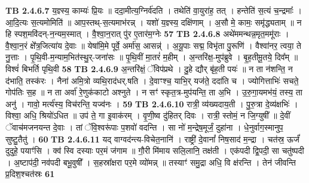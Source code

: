 \documentclass[17pt]{extarticle}
\begin{document}
                  \newline
                                \textbf{ TB 2.4.6.7} \newline
                  य॒ज्ञ्स्य॒ काम्यः॑ प्रि॒यः ॥ ददा॒मीत्य॒ग्निर्व॑दति । तथेति॑ वा॒युरा॑ह॒ तत् । हन्तेति॑ स॒त्यं च॒न्द्रमाः᳚ । आ॒दि॒त्यः स॒त्यमोमिति॑ ॥ आप॒स्तथ्-स॒त्यमाभ॑रन्न् । यशो॑ य॒ज्ञ्स्य॒ दक्षि॑णाम् । अ॒सौ मे॒ कामः॒ समृ॑द्ध्यताम् ॥ न हि स्पश॒मवि॑दन्-न॒न्यम॒स्मात् । वै॒श्वा॒न॒रात् पु॑र ए॒तार॑म॒ग्नेः \textbf{ 57} \newline
                  \newline
                                \textbf{ TB 2.4.6.8} \newline
                  अथे॑ममन्थन्न॒मृत॒ममू॑राः । वै॒श्वा॒न॒रं क्षे᳚त्र॒जित्या॑य दे॒वाः ॥ येषा॑मि॒मे पूर्वे॒ अर्मा॑स॒ आसन्न्॑ । अ॒यू॒पाः सद्म॒ विभृ॑ता पु॒रूणि॑ । वैश्वा॑नर॒ त्वया॒ ते नु॒त्ताः । पृ॒थि॒वी-म॒न्याम॒भित॑स्थु॒र्-जना॑सः ॥ पृ॒थि॒वीं मा॒तरं॑ म॒हीम् । अ॒न्तरि॑क्ष॒-मुप॑ब्रुवे । बृ॒ह॒तीमू॒तये॒ दिव᳚म् ॥ विश्वं॑ बिभर्ति पृथि॒वी \textbf{ 58} \newline
                  \newline
                                \textbf{ TB 2.4.6.9} \newline
                  अ॒न्तरि॑क्षं॒ ॅविप॑प्रथे । दु॒हे द्यौर् बृ॑ह॒ती पयः॑ ॥ न ता न॑शन्ति॒ न द॑भाति॒ तस्क॑रः । नैना॑ अमि॒त्रो व्यथि॒राद॑धर्.षति । दे॒वाꣳश्च॒ याभि॒र् यज॑ते॒ ददा॑ति च । ज्योगित्ताभिः॑ सचते॒ गोप॑तिः स॒ह ॥ न ता अर्वा॑ रे॒णुक॑काटो अश्नुते । न सꣳ॑ स्कृत॒त्र-मुप॑यन्ति॒ ता अ॒भि । उ॒रु॒गा॒यमभ॑यं॒ तस्य॒ ता अनु॑ । गावो॒ मर्त्य॑स्य॒ विच॑रन्ति॒ यज्व॑नः । \textbf{ 59} \newline
                  \newline
                                \textbf{ TB 2.4.6.10} \newline
                  रात्री॒ व्य॑ख्यदाय॒ती । पु॒रु॒त्रा दे॒व्य॑क्षभिः॑ । विश्वा॒ अधि॒ श्रियो॑ऽधित ॥ उप॑ ते॒ गा इ॒वाक॑रम् । वृ॒णी॒ष्व दु॑हितर् दिवः । रात्री॒ स्तोमं॒ न जि॒ग्युषी᳚ ॥ दे॒वीं ॅवाच॑मजनयन्त दे॒वाः । तां ॅवि॒श्वरू॑पाः प॒शवो॑ वदन्ति । सा नो॑ म॒न्द्रेष॒मूर्जं॒ दुहा॑ना । धे॒नुर्वाग॒स्मानुप॒ सुष्टु॒तैतु॑ । \textbf{ 60} \newline
                  \newline
                                \textbf{ TB 2.4.6.11} \newline
                  यद् वाग्वद॑न्त्य-विचेत॒नानि॑ । राष्ट्री॑ दे॒वानां᳚ निष॒साद॑ म॒न्द्रा । चत॑स्र॒ ऊर्जं॑ दुदुहे॒ पयाꣳ॑सि । क्व॑ स्वि दस्याः पर॒मं ज॑गाम ॥ गौ॒री मि॑माय सलि॒लानि॒ तक्ष॑ती । एक॑पदी द्वि॒पदी॒ सा चतु॑ष्पदी । अ॒ष्टाप॑दी॒ नव॑पदी बभू॒वुषी᳚ । स॒हस्रा᳚क्षरा पर॒मे व्यो॑मन्न् ॥ तस्याꣳ॑ समु॒द्रा अधि॒ वि क्ष॑रन्ति । तेन॑ जीवन्ति प्र॒दिश॒श्चत॑स्रः \textbf{ 61} \newline
\end{document}
